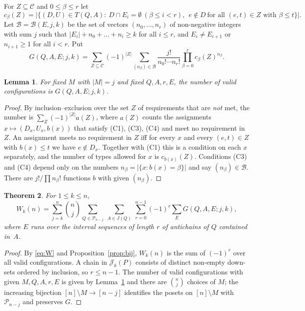 \documentclass[11pt]{article}
\newtheorem{theorem}{Theorem}
\newtheorem{lemma}[theorem]{Lemma}
\theoremstyle{definition}
\theoremstyle{remark}
\newcommand{\cP}{\mathcal{P}}
\newcommand{\cJ}{\mathcal{J}}
\newcommand{\cC}{\mathcal{C}}
\newcommand{\cB}{\mathcal{B}}
\begin{document}
For $Z\subseteq\cC$ and $0\le\beta\le r$ let
\[
 c_\beta(Z)=\bigl|\{(D,U)\in T(Q,A):\ D\cap E_i=\emptyset\ (\beta\le i<r),\ \
 e\notin D\ \text{for all }(e,t)\in Z\text{ with }\beta\le t\}\bigr| .
\]
Let $\cB=\cB(E,j,k)$ be the set of vectors $(n_0,\dots,n_r)$ of non-negative integers with
sum $j$ such that $|E_i|+n_0+\dots+n_i\ge k$ for all $i\le r$, and $E_i\ne E_{i+1}$ or
$n_{i+1}\ge1$ for all $i<r$. Put
\[
 G(Q,A,E;j,k)=\sum_{Z\subseteq\cC}(-1)^{|Z|}\sum_{(n_\beta)\in\cB}
 \frac{j!}{n_0!\cdots n_r!}\prod_{\beta=0}^{r}c_\beta(Z)^{n_\beta}.
\]

\begin{lemma}\label{lem:G}
For fixed $M$ with $|M|=j$ and fixed $Q,A,r,E$, the number of valid configurations is
$G(Q,A,E;j,k)$.
\end{lemma}
\begin{proof}
By inclusion--exclusion over the set $Z$ of requirements that are \emph{not} met, the
number is $\sum_Z(-1)^{|Z|}a(Z)$, where $a(Z)$ counts the assignments
$x\mapsto(D_x,U_x,b(x))$ that satisfy (C1), (C3), (C4) and meet no requirement in $Z$.
An assignment meets no requirement in $Z$ iff for every $x$ and every $(e,t)\in Z$ with
$b(x)\le t$ we have $e\notin D_x$. Together with (C1) this is a condition on each $x$
separately, and the number of types allowed for $x$ is $c_{b(x)}(Z)$. Conditions (C3) and
(C4) depend only on the numbers $n_\beta=|\{x:b(x)=\beta\}|$ and say $(n_\beta)\in\cB$.
There are $j!/\prod n_\beta!$ functions $b$ with given $(n_\beta)$.
\end{proof}

\begin{theorem}\label{thm:formula}
For $1\le k\le n$,
\[
 W_k(n)=\sum_{j=k}^{n}\binom nj\sum_{Q\in\cP_{n-j}}\ \sum_{A\in J(Q)}\ \sum_{r=0}^{n-1}(-1)^r
 \sum_{E}G(Q,A,E;j,k),
\]
where $E$ runs over the interval sequences of length $r$ of antichains of $Q$ contained
in~$A$.
\end{theorem}
\begin{proof}
By \eqref{eq:W} and Proposition~\ref{prop:bij}, $W_k(n)$ is the sum of $(-1)^r$ over all
valid configurations. A chain in $\cJ_k(P)$ consists of distinct non-empty down-sets
ordered by inclusion, so $r\le n-1$. The number of valid configurations with given
$M,Q,A,r,E$ is given by Lemma~\ref{lem:G} and there are $\binom nj$ choices of $M$; the
increasing bijection $[n]\setminus M\to[n-j]$ identifies the posets on $[n]\setminus M$
with $\cP_{n-j}$ and preserves $G$.
\end{proof}
\end{document}
